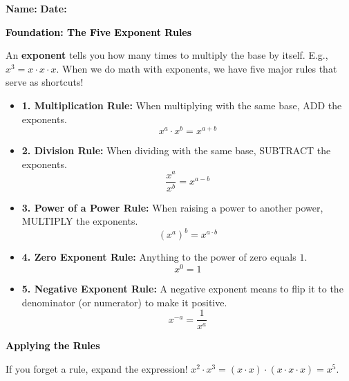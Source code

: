 \documentclass[12pt, letterpaper, fleqn]{article}
\begin{document}
\textbf{Name:} \underline{\hspace{5cm}}
\hfill
\textbf{Date:} \underline{\hspace{3cm}}\\

\begin{tcolorbox}[colback=customteal!20]
    \large\textcolor{black}{\textbf{Foundation: The Five Exponent Rules}}
\end{tcolorbox}

\vspace{3mm}

\noindent
An \textbf{exponent} tells you how many times to multiply the base by itself. E.g., $x^3 = x \cdot x \cdot x$. When we do math with exponents, we have five major rules that serve as shortcuts!

\begin{itemize}
    \item \textbf{1. Multiplication Rule:} When multiplying with the same base, ADD the exponents. 
    \[ x^a \cdot x^b = x^{a+b} \]
    \item \textbf{2. Division Rule:} When dividing with the same base, SUBTRACT the exponents.
    \[ \dfrac{x^a}{x^b} = x^{a-b} \]
    \item \textbf{3. Power of a Power Rule:} When raising a power to another power, MULTIPLY the exponents.
    \[ (x^a)^b = x^{a \cdot b} \]
    \item \textbf{4. Zero Exponent Rule:} Anything to the power of zero equals $1$.
    \[ x^0 = 1 \]
    \item \textbf{5. Negative Exponent Rule:} A negative exponent means to flip it to the denominator (or numerator) to make it positive.
    \[ x^{-a} = \dfrac{1}{x^a} \]
\end{itemize}

\vspace{4mm}

\begin{tcolorbox}[colback=customteal!20]
\large\textcolor{black}{\textbf{Applying the Rules}}
\end{tcolorbox}

\noindent
If you forget a rule, expand the expression! $x^2 \cdot x^3 = (x \cdot x) \cdot (x \cdot x \cdot x) = x^5$. 
\end{document}
